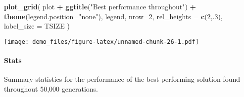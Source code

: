 \documentclass[]{book}
\newenvironment{Shaded}{\begin{snugshade}}{\end{snugshade}}
\newcommand{\DataTypeTok}[1]{\textcolor[rgb]{0.13,0.29,0.53}{#1}}
\newcommand{\DecValTok}[1]{\textcolor[rgb]{0.00,0.00,0.81}{#1}}
\newcommand{\KeywordTok}[1]{\textcolor[rgb]{0.13,0.29,0.53}{\textbf{#1}}}
\newcommand{\NormalTok}[1]{#1}
\newcommand{\OperatorTok}[1]{\textcolor[rgb]{0.81,0.36,0.00}{\textbf{#1}}}
\newcommand{\OtherTok}[1]{\textcolor[rgb]{0.56,0.35,0.01}{#1}}
\newcommand{\StringTok}[1]{\textcolor[rgb]{0.31,0.60,0.02}{#1}}
\let\oldparagraph\paragraph
\renewcommand{\paragraph}[1]{\oldparagraph{#1}\mbox{}}
\begin{document}
\begin{Shaded}
\begin{Highlighting}[]
\KeywordTok{plot_grid}\NormalTok{(}
\NormalTok{  plot }\OperatorTok{+}
\StringTok{    }\KeywordTok{ggtitle}\NormalTok{(}\StringTok{"Best performance throughout"}\NormalTok{) }\OperatorTok{+}
\StringTok{    }\KeywordTok{theme}\NormalTok{(}\DataTypeTok{legend.position=}\StringTok{"none"}\NormalTok{),}
\NormalTok{  legend,}
  \DataTypeTok{nrow=}\DecValTok{2}\NormalTok{,}
  \DataTypeTok{rel_heights =} \KeywordTok{c}\NormalTok{(}\DecValTok{2}\NormalTok{,.}\DecValTok{3}\NormalTok{),}
  \DataTypeTok{label_size =}\NormalTok{ TSIZE}
\NormalTok{)}
\end{Highlighting}
\end{Shaded}

\texttt{[image: demo\_files/figure-latex/unnamed-chunk-26-1.pdf]}

\hypertarget{stats-22}{%
\paragraph{Stats}\label{stats-22}}

Summary statistics for the performance of the best performing solution found throughout 50,000 generations.

\begin{Shaded}
\end{Shaded}
\end{document}
